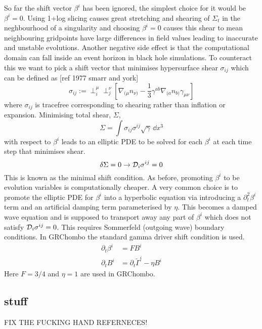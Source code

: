 So far the shift vector $\beta^i$ has been ignored, the simplest choice for it would be $\beta^i=0$. Using 1+log slicing causes great stretching and shearing of $\Sigma_t$ in the neghbourhood of a singularity and choosing $\beta^i=0$ causes this shear to mean neighbouring gridpoints have large differences in field values leading to inaccurate and unstable evolutions. Another negative side effect is that the computational domain can fall inside an event horizon in black hole simulations. To counteract this we want to pick a shift vector that minimises hypersurface shear $\sigma_{ij}$ which can be defined as [ref 1977 smarr and york]
\begin{equation} \sigma_{ij}:= \perp^\mu_i \perp^\nu_j \left[\nabla_{(\mu} n_{\nu)}-\frac{1}{3}\gamma^{ab}\nabla_{(a} n_{b)} \gamma_{\mu\nu}\right] \end{equation}
where $\sigma_{ij}$ is tracefree corresponding to shearing rather than inflation or expansion. Minimising total shear, $\Sigma$,
\begin{equation} \Sigma = \int \sigma_{ij}\sigma^{ij}\sqrt{\gamma}\,\dd x^3\end{equation}
with respect to $\beta^i$ leads to an elliptic PDE to be solved for each $\beta^i$ at each time step that minimises shear. 
\begin{equation} \delta \Sigma = 0 \rightarrow \mathcal{D}_i\sigma^{ij}=0\end{equation}
This is known as the minimal shift condition. As before, promoting $\beta^i$ to be evolution variables is computationally cheaper. A very common choice is to promote the elliptic PDE for $\beta^i$ into a hyperbolic equation via introducing a $\partial_t^2\beta^i$ term and an artificial damping term parameterised by $\eta$. This becomes a damped wave equation and is supposed to transport away any part of $\beta^i$ which does not satisfy $\mathcal{D}_i \sigma^{ij}=0$. This requires Sommerfeld (outgoing wave) boundary conditions. In GRChombo the standard gamma driver shift condition is used.
\begin{align} \partial_t \beta^i &= FB^i\\
 \partial_t B^i &= \partial_t \tilde{\Gamma}^i - \eta B^i\end{align}
Here $F=3/4$ and $\eta=1$ are used in GRChombo.


\subsection{stuff}
FIX THE FUCKING HAND REFERNECES!


